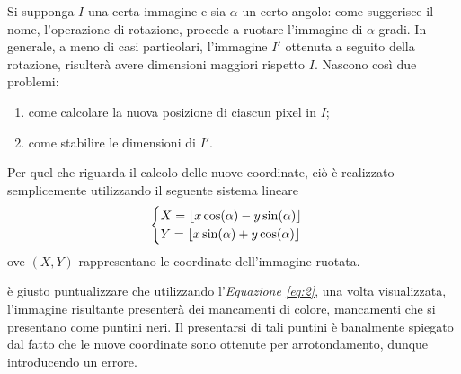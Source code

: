 \documentclass{subfiles}
\begin{document}
Si supponga \(I\) una certa immagine e sia \(\alpha\) un certo angolo: come suggerisce il nome, l'operazione di rotazione, procede a ruotare l'immagine di \(\alpha\) gradi.
In generale, a meno di casi particolari\footnotemark[7], l'immagine \(I'\) ottenuta a seguito della rotazione, risulterà avere dimensioni maggiori rispetto \(I\).
Nascono così due problemi:
\begin{enumerate}
    \item come calcolare la nuova posizione di ciascun pixel in \(I\);
    \item come stabilire le dimensioni di \(I'\).
\end{enumerate}

Per quel che riguarda il calcolo delle nuove coordinate, ciò è realizzato semplicemente utilizzando il seguente sistema lineare
\begin{equation}
    \begin{cases}
        X = \left\lfloor x \cos(\alpha) - y \sin(\alpha) \right\rfloor \\
        Y = \left\lfloor x \sin(\alpha) + y \cos(\alpha) \right\rfloor \\
    \end{cases}
\end{equation}
ove \((X, Y)\) rappresentano le coordinate dell'immagine ruotata.

\begin{Remark*}
    è giusto puntualizzare che utilizzando l'\emph{Equazione \eqref{eq:2}}, una volta visualizzata,
    l'immagine risultante presenterà dei mancamenti di colore, mancamenti che si presentano come puntini neri.
    Il presentarsi di tali puntini è banalmente spiegato dal fatto che le nuove coordinate sono ottenute per arrotondamento, dunque introducendo un errore.
\end{Remark*}
\end{document}
